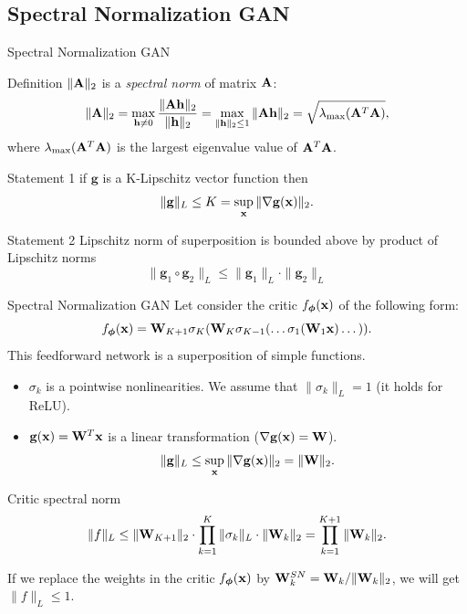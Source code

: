 \subsection{Spectral Normalization GAN}
\begin{frame}{Spectral Normalization GAN}
	\begin{block}{Definition}
		$\| \mathbf{A} \|_2$ is a \textit{spectral norm} of matrix $\mathbf{A}$:
		\[
			\| \mathbf{A} \|_2 = \max_{\mathbf{h} \neq 0} \frac{\|\mathbf{A} \mathbf{h}\|_2}{\|\mathbf{h}\|_2} = \max_{\|\mathbf{h}\|_2 \leq 1} \| \mathbf{A} \mathbf{h} \|_2 = \sqrt{\lambda_{\text{max}}(\mathbf{A}^T \mathbf{A})},
		\]
		where $\lambda_{\text{max}}(\mathbf{A}^T \mathbf{A})$ is the largest eigenvalue value of $\mathbf{A}^T \mathbf{A}$.
	\end{block}
	\begin{block}{Statement 1}
		if $\mathbf{g}$ is a K-Lipschitz vector function then 
		\[
			\| \mathbf{g} \|_L \leq K = \sup_{\mathbf{x}} \| \nabla \mathbf{g}(\mathbf{x}) \|_2.
		\]
		\vspace{-0.7cm}
	\end{block}
	\begin{block}{Statement 2}
		Lipschitz norm of superposition is bounded above by product of Lipschitz norms
		\vspace{-0.2cm}
		\[
			\| \mathbf{g}_1 \circ \mathbf{g}_2 \|_L \leq \| \mathbf{g}_1 \|_L \cdot \| \mathbf{g}_2\|_L
		\]
	\end{block}
\end{frame}
\begin{frame}{Spectral Normalization GAN}
	Let consider the critic $f_{\boldsymbol{\phi}}(\mathbf{x})$ of the following form:
	\[
		f_{\boldsymbol{\phi}}(\mathbf{x}) = \mathbf{W}_{K+1} \sigma_K (\mathbf{W}_K \sigma_{K-1}(\dots \sigma_1(\mathbf{W}_1 \mathbf{x}) \dots)).
	\]
	This feedforward network is a superposition of simple functions.
	\begin{itemize}
		\item $\sigma_k$ is a pointwise nonlinearities. We assume that $\| \sigma_k \|_L = 1$ (it holds for ReLU).
		\item $\mathbf{g}(\mathbf{x}) = \mathbf{W}^T \mathbf{x}$ is a linear transformation ($\nabla \mathbf{g}(\mathbf{x}) = \mathbf{W}$).
		\[
			\| \mathbf{g} \|_L \leq \sup_{\mathbf{x}} \| \nabla \mathbf{g}(\mathbf{x})\|_2 = \| \mathbf{W} \|_2.
		\]
	\end{itemize}
	\vspace{-0.4cm}
	\begin{block}{Critic spectral norm}
		\vspace{-0.4cm}
		\[
			\| f \|_L \leq \| \mathbf{W}_{K+1}\|_2 \cdot \prod_{k=1}^K  \| \sigma_k \|_L \cdot \| \mathbf{W}_k \|_2 = \prod_{k=1}^{K+1} \|\mathbf{W}_k\|_2.
		\]
		\vspace{-0.2cm}
	\end{block}
	If we replace the weights in the critic $f_{\boldsymbol{\phi}}(\mathbf{x})$ by $\mathbf{W}^{SN}_k = \mathbf{W}_k / \|\mathbf{W}_k\|_2$, we will get $\| f\|_L \leq 1.$ \\
	
\end{frame}
